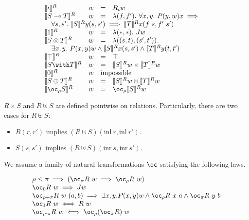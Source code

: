 \begin{displaymath}
  \begin{array}{llll}
    \llbracket \base \rrbracket^R & w & = & R_\base w \\
    \llbracket \fun{S}{T} \rrbracket^R & w & = & \lambda (f, f').~\forall x,y.~P(y,w)x \implies \phantom{X} \\
    \quad \forall s,s'.~\llbracket S \rrbracket^R y (s, s') \implies \llbracket
    T \rrbracket^R x (f~s, f'~s') \span \span \span \\
    \llbracket \tensorOne \rrbracket^R & w & = & \lambda (*, *).~J w \\
    \llbracket \tensor{S}{T} \rrbracket^R & w & = & \lambda ((s, t), (s', t')). \\
    \quad \exists x,y.~P(x,y)w \wedge \llbracket S \rrbracket^R x (s, s') \wedge
    \llbracket T \rrbracket^R y (t, t') \span \span \span \\
    \llbracket \withTOne \rrbracket^R & w & = & \top \\
    \llbracket \withT{S}{T} \rrbracket^R & w & = & \llbracket S \rrbracket^R w \times \llbracket T \rrbracket^R w \\
    \llbracket \sumTZero \rrbracket^R & w & \mathrm{impossible} \span \\
    \llbracket \sumT{S}{T} \rrbracket^R & w & = & \llbracket S \rrbracket^R w \uplus \llbracket T \rrbracket^R w \\
    \llbracket \excl{\rho}{S} \rrbracket^R & w & = & \oc_\rho \llbracket S
                                                   \rrbracket^R w \\
  \end{array}
\end{displaymath}

$R \times S$ and $R \uplus S$ are defined pointwise on relations.
Particularly, there are two cases for $R \uplus S$:

\begin{itemize}
  \item $R(r, r')$ implies $(R \uplus S)(\mathrm{inl}~r, \mathrm{inl}~r')$.
  \item $S(s, s')$ implies $(R \uplus S)(\mathrm{inr}~s, \mathrm{inr}~s')$.
\end{itemize}

We assume a family of natural transformations $\oc$ satisfying the following laws.

\begin{displaymath}
  \begin{array}{l}
    \rho \leq \pi \implies (\oc_\pi R~w \implies \oc_\rho R~w) \\
    \oc_0 R~w \implies J w \\
    \oc_{\rho+\pi} R~w~(a, b) \implies \exists x,y. P(x,y)w \wedge \oc_\rho R~x~a \wedge \oc_\pi R~y~b \\
    \oc_1 R~w \iff R~w \\
    \oc_{\rho \cdot \pi} R~w \iff \oc_\rho(\oc_\pi R)~w
  \end{array}
\end{displaymath}

